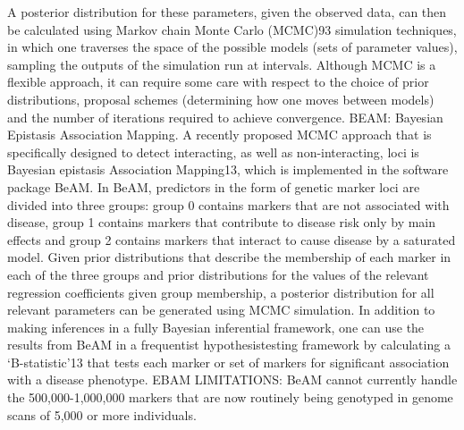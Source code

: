 	A posterior distribution for these parameters, given the observed data, can then be calculated using Markov chain Monte Carlo (MCMC)93 simulation techniques, in which one traverses the space of the possible models (sets of parameter values), sampling the outputs of the simulation run at intervals. Although MCMC is a flexible approach, it can require some care with respect to the choice of prior distributions, proposal schemes (determining how one moves between models) and the number of iterations required to achieve convergence. \cite{cordell2009detecting}
	BEAM: Bayesian Epistasis Association Mapping. A recently proposed MCMC approach that is specifically designed to detect interacting, as well as non-interacting, loci is Bayesian epistasis Association Mapping13, which is implemented in the software package BeAM. In BeAM, predictors in the form of genetic marker loci are divided into three groups: group 0 contains markers that are not associated with disease, group 1 contains markers that contribute to disease risk only by main effects and group 2 contains markers that interact to cause disease by a saturated model. Given prior distributions that describe the membership of each marker in each of the three groups and prior distributions for the values of the relevant regression coefficients given group membership, a posterior distribution for all relevant parameters can be generated using MCMC simulation. In addition to making inferences in a fully Bayesian inferential framework, one can use the results from BeAM in a frequentist hypothesistesting framework by calculating a `B-statistic'13 that tests each marker or set of markers for significant association with a disease phenotype. \cite{cordell2009detecting}
	EBAM LIMITATIONS: BeAM cannot currently handle the 500,000-1,000,000 markers that are now routinely being genotyped in genome scans of 5,000 or more individuals. \cite{cordell2009detecting}

